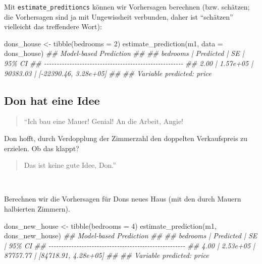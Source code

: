 \documentclass[
  a4paper,
  DIV=11]{scrreprt}
\newenvironment{Shaded}{\begin{snugshade}}{\end{snugshade}}
\newcommand{\AttributeTok}[1]{\textcolor[rgb]{0.40,0.45,0.13}{#1}}
\newcommand{\DecValTok}[1]{\textcolor[rgb]{0.68,0.00,0.00}{#1}}
\newcommand{\DocumentationTok}[1]{\textcolor[rgb]{0.37,0.37,0.37}{\textit{#1}}}
\newcommand{\FunctionTok}[1]{\textcolor[rgb]{0.28,0.35,0.67}{#1}}
\newcommand{\NormalTok}[1]{\textcolor[rgb]{0.00,0.23,0.31}{#1}}
\newcommand{\OtherTok}[1]{\textcolor[rgb]{0.00,0.23,0.31}{#1}}
\theoremstyle{definition}
\theoremstyle{remark}
\begin{document}
Mit \texttt{estimate\_preditioncs} können wir Vorhersagen berechnen
(bzw. schätzen; die Vorhersagen sind ja mit Ungewissheit verbunden,
daher ist ``schätzen'' vielleicht das treffendere Wort):

\begin{Shaded}
\begin{Highlighting}[]
\NormalTok{dons\_house }\OtherTok{\textless{}{-}} \FunctionTok{tibble}\NormalTok{(}\AttributeTok{bedrooms =} \DecValTok{2}\NormalTok{)}
\FunctionTok{estimate\_prediction}\NormalTok{(m1, }\AttributeTok{data =}\NormalTok{ dons\_house)}
\DocumentationTok{\#\# Model{-}based Prediction}
\DocumentationTok{\#\# }
\DocumentationTok{\#\# bedrooms | Predicted |       SE |                95\% CI}
\DocumentationTok{\#\# {-}{-}{-}{-}{-}{-}{-}{-}{-}{-}{-}{-}{-}{-}{-}{-}{-}{-}{-}{-}{-}{-}{-}{-}{-}{-}{-}{-}{-}{-}{-}{-}{-}{-}{-}{-}{-}{-}{-}{-}{-}{-}{-}{-}{-}{-}{-}{-}{-}{-}{-}{-}{-}{-}{-}}
\DocumentationTok{\#\# 2.00     |  1.57e+05 | 90383.03 | [{-}22390.46, 3.28e+05]}
\DocumentationTok{\#\# }
\DocumentationTok{\#\# Variable predicted: price}
\end{Highlighting}
\end{Shaded}

\hypertarget{don-hat-eine-idee}{%
\subsection{Don hat eine Idee}\label{don-hat-eine-idee}}

\begin{quote}
``Ich bau eine Mauer! Genial! An die Arbeit, Angie! 🧑
\end{quote}

Don hofft, durch Verdopplung der Zimmerzahl den doppelten Verkaufspreis
zu erzielen. Ob das klappt?

\begin{quote}
Das ist keine gute Idee, Don.''
\end{quote}

👩

Berechnen wir die Vorhersagen für Dons neues Haus (mit den durch Mauern
halbierten Zimmern).

\begin{Shaded}
\begin{Highlighting}[]
\NormalTok{dons\_new\_house }\OtherTok{\textless{}{-}} \FunctionTok{tibble}\NormalTok{(}\AttributeTok{bedrooms =} \DecValTok{4}\NormalTok{)}
\FunctionTok{estimate\_prediction}\NormalTok{(m1, dons\_new\_house)}
\DocumentationTok{\#\# Model{-}based Prediction}
\DocumentationTok{\#\# }
\DocumentationTok{\#\# bedrooms | Predicted |       SE |               95\% CI}
\DocumentationTok{\#\# {-}{-}{-}{-}{-}{-}{-}{-}{-}{-}{-}{-}{-}{-}{-}{-}{-}{-}{-}{-}{-}{-}{-}{-}{-}{-}{-}{-}{-}{-}{-}{-}{-}{-}{-}{-}{-}{-}{-}{-}{-}{-}{-}{-}{-}{-}{-}{-}{-}{-}{-}{-}{-}{-}}
\DocumentationTok{\#\# 4.00     |  2.53e+05 | 87757.77 | [84718.91, 4.28e+05]}
\DocumentationTok{\#\# }
\DocumentationTok{\#\# Variable predicted: price}
\end{Highlighting}
\end{Shaded}
\end{document}
